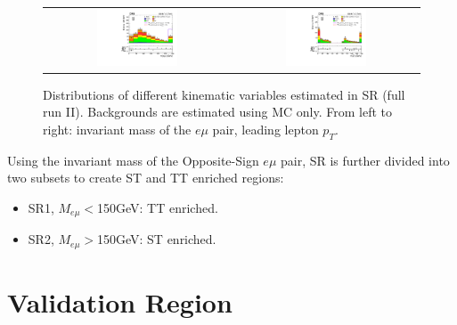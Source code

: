 \begin{figure}[tbh!]
 \begin{center}
 \begin{tabular}{cc}
 \includegraphics[width=0.45\textwidth]{figures/Part3/Selection/Memu}&
 \includegraphics[width=0.45\textwidth]{figures/Part3/Selection/Zmass} \\
 \end{tabular}
 \caption{Distributions of different kinematic variables estimated in SR (full run II). Backgrounds are estimated using MC only. From left to right: invariant mass of the $e\mu$ pair, leading lepton $p_{T}$.}
 \label{fig:SR}
 \end{center}
\end{figure}

Using the invariant mass of the Opposite-Sign $e\mu$ pair, SR is further divided into two subsets to create ST and TT enriched regions:
\begin{itemize}
\item SR1, $M_{e\mu}<$150GeV: TT enriched.
\item SR2, $M_{e\mu}>$150GeV: ST enriched.
\end{itemize}
\section{Validation Region}
\label{sec:VR}

